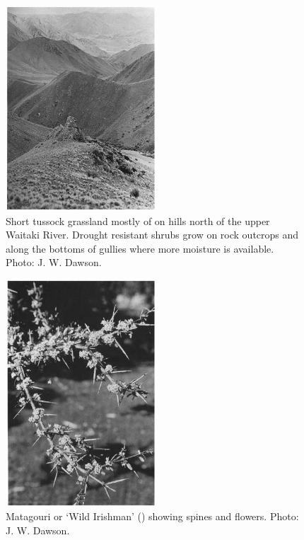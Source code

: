\begin{figure}
	\includegraphics[width=0.5\textwidth]{graphics/figure82short-tussock.jpg}
	\centering
	\caption[Short tussock grassland mostly of Festuca novae-zelandiae]{Short tussock grassland mostly of  on hills north of the upper Waitaki River.
	Drought resistant shrubs grow on rock outcrops and along the bottoms of gullies where more moisture is available.  Photo:  J. W. Dawson.}%
	\label{fig:82short-tussock}
\end{figure}

\begin{figure}
	\includegraphics[width=0.5\textwidth]{graphics/figure83matagouri.jpg}
	\centering
	\caption[Matagouri]{Matagouri or `Wild Irishman' () showing spines and flowers.
	Photo:  J. W. Dawson.}%
	\label{fig:83matagouri}
\end{figure}

